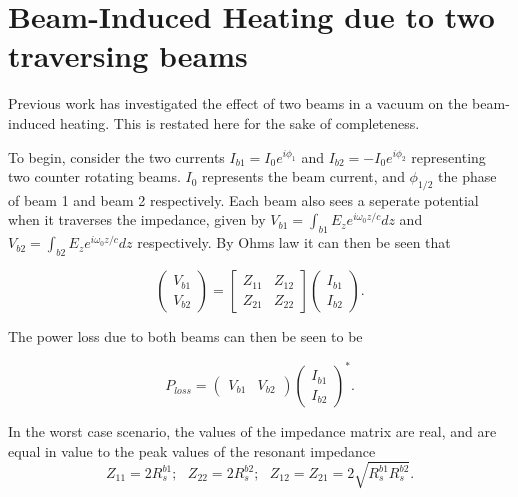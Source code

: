 \documentclass{cernyrep}
\begin{document}
\section{Beam-Induced Heating due to two traversing beams}

Previous work \cite{Grudiev:twoBeamCol} has investigated the effect of two beams in a vacuum on the beam-induced heating. This is restated here for the sake of completeness.

To begin, consider the two currents $I_{b1} = I_{0}e^{i\phi_{1}}$ and $I_{b2} = -I_{0}e^{i\phi_{2}}$ representing two counter rotating beams. $I_{0}$ represents the beam current, and $\phi_{1/2}$ the phase of beam 1 and beam 2 respectively. Each beam also sees a seperate potential when it traverses the impedance, given by $V_{b1} = \int_{b1} E_{z} e^{i\omega_{0}z/c} dz$ and $V_{b2} = \int_{b2} E_{z} e^{i\omega_{0}z/c} dz$ respectively. By Ohms law it can then be seen that

\begin{equation}
\begin{pmatrix}
V_{b1} \\
V_{b2}
\end{pmatrix}
=
\begin{bmatrix}
Z_{11} & Z_{12} \\
Z_{21} & Z_{22}
\end{bmatrix}
\begin{pmatrix}
I_{b1} \\
I_{b2}
\end{pmatrix}.
\end{equation}

The power loss due to both beams can then be seen to be

\begin{equation}
P_{loss} = \begin{pmatrix}
V_{b1} & V_{b2}
\end{pmatrix}
\begin{pmatrix}
I_{b1} \\
I_{b2}
\end{pmatrix}^{*}.
\end{equation}

In the worst case scenario, the values of the impedance matrix are real, and are equal in value to the peak values of the resonant impedance
\begin{equation}
Z_{11} = 2R^{b1}_{s};\text{    } Z_{22} = 2R^{b2}_{s};\text{    }  Z_{12} = Z_{21} = 2 \sqrt{R^{b1}_{s}R^{b2}_{s}}.
\end{equation}
\end{document}
